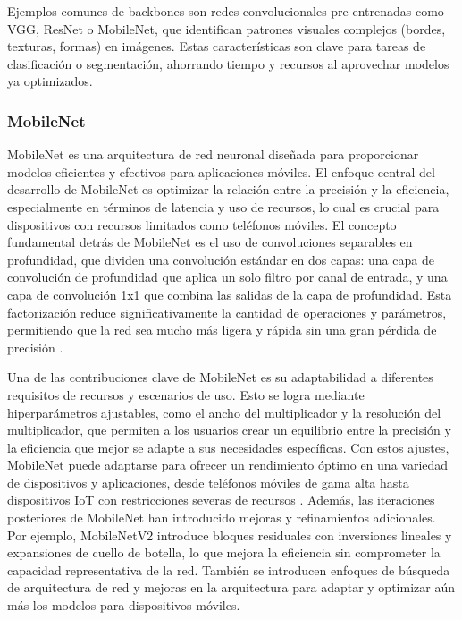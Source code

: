 Ejemplos comunes de backbones son redes convolucionales pre-entrenadas como VGG, ResNet o MobileNet, que identifican patrones visuales complejos (bordes, texturas, formas) en imágenes. Estas características son clave para tareas de clasificación o segmentación, ahorrando tiempo y recursos al aprovechar modelos ya optimizados.

\subsubsection{MobileNet}

MobileNet \cite{howard2017} es una arquitectura de red neuronal diseñada para proporcionar modelos eficientes y efectivos para aplicaciones móviles. El enfoque central del desarrollo de MobileNet es optimizar la relación entre la precisión y la eficiencia, especialmente en términos de latencia y uso de recursos, lo cual es crucial para dispositivos con recursos limitados como teléfonos móviles. El concepto fundamental detrás de MobileNet es el uso de convoluciones separables en profundidad, que dividen una convolución estándar en dos capas: una capa de convolución de profundidad que aplica un solo filtro por canal de entrada, y una capa de convolución 1x1 que combina las salidas de la capa de profundidad.  Esta factorización reduce significativamente la cantidad de operaciones y parámetros, permitiendo que la red sea mucho más ligera y rápida sin una gran pérdida de precisión \cite{elharrouss2022}.

Una de las contribuciones clave de MobileNet es su adaptabilidad a diferentes requisitos de recursos y escenarios de uso. Esto se logra mediante hiperparámetros ajustables, como el ancho del multiplicador y la resolución del multiplicador, que permiten a los usuarios crear un equilibrio entre la precisión y la eficiencia que mejor se adapte a sus necesidades específicas. Con estos ajustes, MobileNet puede adaptarse para ofrecer un rendimiento óptimo en una variedad de dispositivos y aplicaciones, desde teléfonos móviles de gama alta hasta dispositivos IoT con restricciones severas de recursos \cite{elharrouss2022}.  Además, las iteraciones posteriores de MobileNet han introducido mejoras y refinamientos adicionales. Por ejemplo, MobileNetV2 introduce bloques residuales con inversiones lineales y expansiones de cuello de botella, lo que mejora la eficiencia sin comprometer la capacidad representativa de la red. También se introducen enfoques de búsqueda de arquitectura de red y mejoras en la arquitectura para adaptar y optimizar aún más los modelos para dispositivos móviles.

